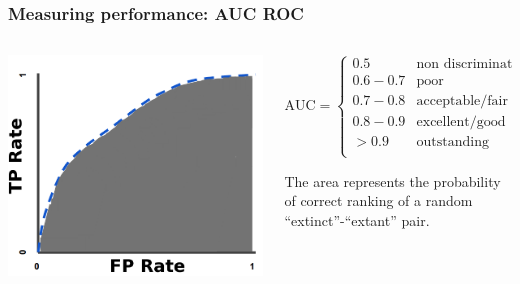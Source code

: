 \documentclass{beamer}
\begin{document}
\begin{frame}
  \frametitle{Measuring performance: AUC ROC}

  \begin{columns}
    \begin{column}{0.4\textwidth}
      \includegraphics[width=\textwidth,height=\textheight,keepaspectratio=true]{figure/AUC}
  
  
    \end{column}
    \begin{column}{0.6\textwidth}
      \[
        \text{AUC} = 
        \begin{cases} 
          0.5 & \text{non discrimination}\\
          0.6-0.7 & \text{poor} \\
          0.7-0.8 & \text{acceptable/fair} \\
          0.8-0.9 & \text{excellent/good} \\
          > 0.9 & \text{outstanding} \\
        \end{cases}
      \]

      The area represents the probability of correct ranking of a random ``extinct''-``extant'' pair.
    \end{column}
  \end{columns}

\end{frame}
\end{document}
